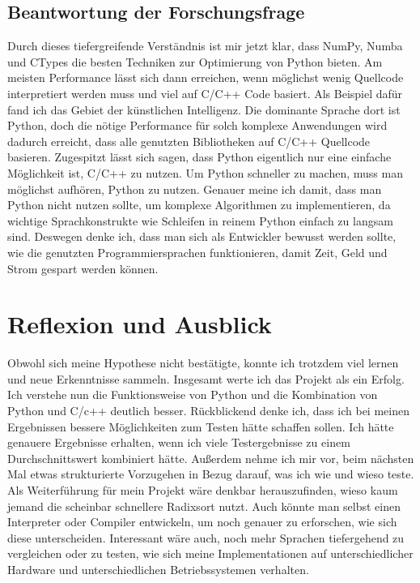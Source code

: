 \documentclass[11pt,a4paper]{article}
\begin{document}
\subsection{Beantwortung der Forschungsfrage}
Durch dieses tiefergreifende Verständnis ist mir jetzt klar, dass NumPy, Numba und CTypes
die besten Techniken zur Optimierung von Python bieten. Am meisten Performance lässt sich dann erreichen,
wenn möglichst wenig Quellcode interpretiert werden muss und viel auf C/C++ Code basiert.
Als Beispiel dafür fand ich das Gebiet der künstlichen Intelligenz.
Die dominante Sprache dort ist Python, doch die nötige Performance für solch komplexe Anwendungen
wird dadurch erreicht, dass alle genutzten Bibliotheken auf C/C++ Quellcode basieren.
Zugespitzt lässt sich sagen, dass Python eigentlich nur eine einfache Möglichkeit ist,
C/C++ zu nutzen. Um Python schneller zu machen, muss man möglichst aufhören, Python zu nutzen.
Genauer meine ich damit, dass man Python nicht nutzen sollte, um komplexe Algorithmen zu implementieren,
da wichtige Sprachkonstrukte wie Schleifen in reinem Python einfach zu langsam sind.
Deswegen denke ich, dass man sich als Entwickler bewusst werden sollte, wie die genutzten
Programmiersprachen funktionieren, damit Zeit, Geld und Strom gespart werden können.


\section{Reflexion und Ausblick}
Obwohl sich meine Hypothese nicht bestätigte, konnte ich trotzdem viel lernen
und neue Erkenntnisse sammeln. Insgesamt werte ich das Projekt als ein Erfolg.
Ich verstehe nun die Funktionsweise von Python und die Kombination von Python und C/c++
deutlich besser.
Rückblickend denke ich, dass ich bei meinen Ergebnissen bessere Möglichkeiten zum Testen
hätte schaffen sollen. Ich hätte genauere Ergebnisse erhalten, wenn ich viele Testergebnisse zu einem
Durchschnittswert kombiniert hätte.
Außerdem nehme ich mir vor, beim nächsten Mal etwas strukturierte Vorzugehen in Bezug darauf,
was ich wie und wieso teste.
Als Weiterführung für mein Projekt wäre denkbar herauszufinden, wieso kaum jemand die scheinbar
schnellere Radixsort nutzt.
Auch könnte man selbst einen Interpreter oder Compiler entwickeln, um noch genauer zu erforschen,
wie sich diese unterscheiden.
Interessant wäre auch, noch mehr Sprachen tiefergehend zu vergleichen oder
zu testen, wie sich meine Implementationen auf unterschiedlicher Hardware und unterschiedlichen Betriebssystemen
verhalten.
\end{document}
